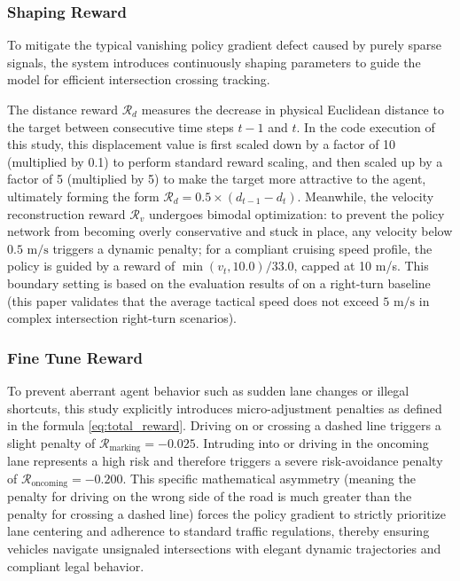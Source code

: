     \subsubsection{Shaping Reward}
    To mitigate the typical vanishing policy gradient defect caused by purely sparse signals, the system introduces continuously shaping parameters to guide the model for efficient intersection crossing tracking.

    The distance reward $\mathcal{R}_d$ measures the decrease in physical Euclidean distance to the target between consecutive time steps $t-1$ and $t$. In the code execution of this study, this displacement value is first scaled down by a factor of 10 (multiplied by 0.1) to perform standard reward scaling, and then scaled up by a factor of 5 (multiplied by 5) to make the target more attractive to the agent, ultimately forming the form $\mathcal{R}_d = 0.5 \times (d_{t-1} - d_t)$. Meanwhile, the velocity reconstruction reward $\mathcal{R}_v$ undergoes bimodal optimization: to prevent the policy network from becoming overly conservative and stuck in place, any velocity below $0.5 \text{ m/s}$ triggers a dynamic penalty; for a compliant cruising speed profile, the policy is guided by a reward of $\min(v_t, 10.0) / 33.0$, capped at 10 m/s. This boundary setting is based on the evaluation results of \cite{elallid_improving_2024} on a right-turn baseline (this paper validates that the average tactical speed does not exceed $5 \text{ m/s}$ in complex intersection right-turn scenarios).
    
    \subsubsection{Fine Tune Reward}
    To prevent aberrant agent behavior such as sudden lane changes or illegal shortcuts, this study explicitly introduces micro-adjustment penalties as defined in the formula \ref{eq:total_reward}. Driving on or crossing a dashed line triggers a slight penalty of $\mathcal{R}_{\text{marking}} = -0.025$. Intruding into or driving in the oncoming lane represents a high risk and therefore triggers a severe risk-avoidance penalty of $\mathcal{R}_{\text{oncoming}} = -0.200$. This specific mathematical asymmetry (meaning the penalty for driving on the wrong side of the road is much greater than the penalty for crossing a dashed line) forces the policy gradient to strictly prioritize lane centering and adherence to standard traffic regulations, thereby ensuring vehicles navigate unsignaled intersections with elegant dynamic trajectories and compliant legal behavior.

